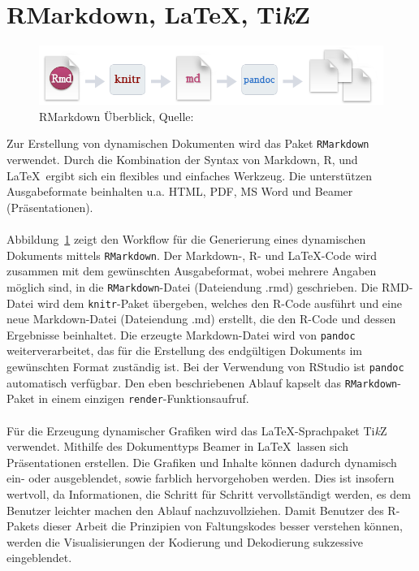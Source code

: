 \section{RMarkdown, \LaTeX, Ti\textit{k}Z}
\label{kapitel:rmarkdown}
\begin{figure}[t]
\centering
\includegraphics[width=\ScaleIfNeeded]{abbildungen/rmarkdown}
\caption[RMarkdown Überblick]{RMarkdown Überblick, Quelle:~\cite{rmarkdown}}
\label{abb:rmarkdown}
\end{figure}
Zur Erstellung von dynamischen Dokumenten wird das Paket \texttt{RMarkdown} verwendet. Durch die Kombination der Syntax von Markdown, R, und \LaTeX\ ergibt sich ein flexibles und einfaches Werkzeug. Die unterstützen Ausgabeformate beinhalten u.a. HTML, PDF, MS Word und Beamer (Präsentationen).
\\
\\
Abbildung~\ref{abb:rmarkdown} zeigt den Workflow für die Generierung eines dynamischen Dokuments mittels \texttt{RMarkdown}. Der Markdown-, R- und \LaTeX -Code wird zusammen mit dem gewünschten Ausgabeformat, wobei mehrere Angaben möglich sind, in die \texttt{RMarkdown}-Datei (Dateiendung .rmd) geschrieben. Die RMD-Datei wird dem \texttt{knitr}-Paket übergeben, welches den R-Code ausführt und eine neue Markdown-Datei (Dateiendung .md) erstellt, die den R-Code und dessen Ergebnisse beinhaltet. Die erzeugte Markdown-Datei wird von \texttt{pandoc} weiterverarbeitet, das für die Erstellung des endgültigen Dokuments im gewünschten Format zuständig ist. Bei der Verwendung von RStudio ist \texttt{pandoc} automatisch verfügbar. Den eben beschriebenen Ablauf kapselt das \texttt{RMarkdown}-Paket in einem einzigen \texttt{render}-Funktionsaufruf.
\\
\\
Für die Erzeugung dynamischer Grafiken wird das \LaTeX -Sprachpaket Ti\textit{k}Z verwendet. Mithilfe des Dokumenttyps Beamer in \LaTeX\ lassen sich Präsentationen erstellen. Die Grafiken und Inhalte können dadurch dynamisch ein- oder ausgeblendet, sowie farblich hervorgehoben werden. Dies ist insofern wertvoll, da Informationen, die Schritt für Schritt vervollständigt werden, es dem Benutzer leichter machen den Ablauf nachzuvollziehen. Damit Benutzer des R-Pakets dieser Arbeit die Prinzipien von Faltungskodes besser verstehen können, werden die Visualisierungen der Kodierung und Dekodierung sukzessive eingeblendet.